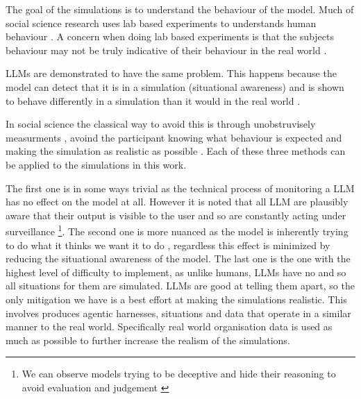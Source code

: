 The goal of the simulations is to understand the behaviour of the model. Much of social science research uses lab based experiments to understands human behaviour \cn. A concern when doing lab based experiments is that the subjects behaviour may not be truly indicative of their behaviour in the real world \cite{orneSocialPsychologyPsychological1962,adairHawthorneEffectReconsideration1984}.

LLMs are demonstrated to have the same problem. This happens because the model can detect that it is in a simulation (situational awareness) \cite{berglundTakenOutContext2023,needhamLargeLanguageModels2025} and is shown to behave differently in a simulation than it would in the real world \cite{greenblattAlignmentFakingLarge2024,meinkeFrontierModelsAre2025a}. 

In social science the classical way to avoid this is through unobstruvisely measurments \cite{webbUnobtrusiveMeasures2000}, avoind the participant knowing what behaviour is expected \cite{orneSocialPsychologyPsychological1962} and making the simulation as realistic as possible \cite{fiskeHandbookSocialPsychology2010}. Each of these three methods can be applied to the simulations in this work.

The first one is in some ways trivial as the technical process of monitoring a LLM has no effect on the model at all. However it is noted that all LLM are plausibly aware that their output is visible to the user and so are constantly acting under surveillance \footnote{We can observe models trying to be deceptive and hide their reasoning to avoid evaluation and judgement \cite{chenReasoningModelsDont2025,bakerMonitoringReasoningModels2025}}.
The second one is more nuanced as the model is inherently trying to do what it thinks we want it to do , regardless this effect is minimized by reducing the situational awareness of the model.
The last one is the one with the highest level of difficulty to implement, as unlike humans, LLMs have no  and so all situations for them are simulated. LLMs are good at telling them apart, so the only mitigation we have is a best effort at making the simulations realistic. This involves produces agentic harnesses, situations and data that operate in a similar manner to the real world. Specifically real world organisation data is used as much as possible to further increase the realism of the simulations. 


